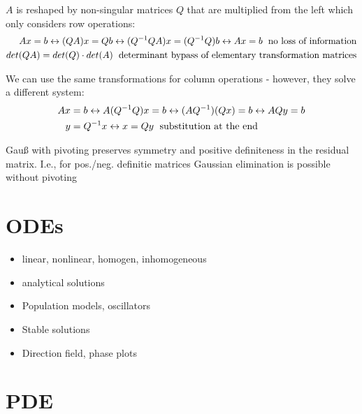 \begin{definition}
	$A$ is reshaped by non-singular matrices $Q$ that are multiplied from the left which only considers row operations:
	\begin{align*}
		Ax=b \leftrightarrow (QA)x = Qb \leftrightarrow (Q^{-1}QA)x = (Q^{-1}Q)b \leftrightarrow Ax = b \text{\; no loss of information} \\
		det (QA) = det(Q) \cdot det(A) \text{\; determinant bypass of elementary transformation matrices}
	\end{align*}
\end{definition}

\begin{definition}
	We can use the same transformations for column operations - however, they solve a different system:
	\begin{align*}
	Ax&=b \leftrightarrow A(Q^{-1}Q)x=b \leftrightarrow (AQ^{-1})(Qx)=b \leftrightarrow AQy = b \\
	y &= Q^{-1}x  \leftrightarrow x = Qy \text{\; substitution at the end}
	\end{align*}
\end{definition}

\begin{satz}
	Gauß with pivoting preserves symmetry and positive definiteness in the residual matrix. I.e., for pos./neg. definitie matrices Gaussian elimination is possible without pivoting
\end{satz}

\pagebreak

\section{ODEs}
\begin{itemize}
	\item linear, nonlinear, homogen, inhomogeneous
	\item analytical solutions
	\item Population models, oscillators
	\item Stable solutions
	\item Direction field, phase plots
\end{itemize}


\section{PDE}

